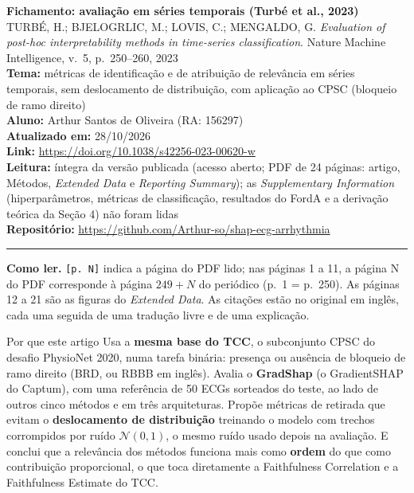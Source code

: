 \documentclass[11pt,a4paper]{article}
\begin{document}
\begin{center}
    {\LARGE \textbf{Fichamento: avaliação em séries temporais (Turbé et al., 2023)}} \\[0.35em]
    {\large TURBÉ, H.; BJELOGRLIC, M.; LOVIS, C.; MENGALDO, G. \textit{Evaluation of post-hoc interpretability methods in time-series classification}. Nature Machine Intelligence, v.~5, p.~250--260, 2023} \\[0.3em]
    \textbf{Tema:} métricas de identificação e de atribuição de relevância em séries temporais, sem deslocamento de distribuição, com aplicação ao CPSC (bloqueio de ramo direito) \\[0.2em]
    \textbf{Aluno:} Arthur Santos de Oliveira (RA: 156297) \\[0.2em]
    \textbf{Atualizado em:} 28/10/2026 \\[0.2em]
    \textbf{Link:} \url{https://doi.org/10.1038/s42256-023-00620-w} \\[0.2em]
    \textbf{Leitura:} íntegra da versão publicada (acesso aberto; PDF de 24 páginas: artigo, Métodos, \textit{Extended Data} e \textit{Reporting Summary}); as \textit{Supplementary Information} (hiperparâmetros, métricas de classificação, resultados do FordA e a derivação teórica da Seção 4) não foram lidas \\[0.2em]
    \textbf{Repositório:} \url{https://github.com/Arthur-so/shap-ecg-arrhythmia}
\end{center}
\vspace{-0.5em}
\hrule
\vspace{0.8em}

\textbf{Como ler.} \texttt{[p. N]} indica a página do PDF lido; nas páginas 1 a 11, a página N do PDF corresponde à página $249+N$ do periódico (p.~1 = p.~250). As páginas 12 a 21 são as figuras do \textit{Extended Data}. As citações estão no original em inglês, cada uma seguida de uma tradução livre e de uma explicação.

\begin{infobox}[note]{Por que este artigo}
Usa a \textbf{mesma base do TCC}, o subconjunto CPSC do desafio PhysioNet 2020, numa tarefa binária: presença ou ausência de bloqueio de ramo direito (BRD, ou RBBB em inglês). Avalia o \textbf{GradShap} (o GradientSHAP do Captum), com uma referência de 50 ECGs sorteados do teste, ao lado de outros cinco métodos e em três arquiteturas. Propõe métricas de retirada que evitam o \textbf{deslocamento de distribuição} treinando o modelo com trechos corrompidos por ruído $\mathcal{N}(0,1)$, o mesmo ruído usado depois na avaliação. E conclui que a relevância dos métodos funciona mais como \textbf{ordem} do que como contribuição proporcional, o que toca diretamente a Faithfulness Correlation e a Faithfulness Estimate do TCC.
\end{infobox}
\end{document}
